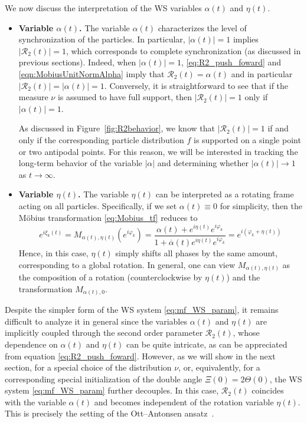 \documentclass[10pt]{article}
\theoremstyle{definition}
\theoremstyle{definition}
\numberwithin{equation}{section}
\newcommand{\CR}{\mathcal{R}}
\newcommand{\alphaBar}{\overline{\alpha}}
\begin{document}
We now discuss the interpretation of the WS variables $\alpha(t)$ and $\eta(t)$.
\begin{itemize}
    \item \textbf{Variable $\alpha(t)$.}
   The variable
    $\alpha(t)$ characterizes the level of synchronization of the particles.
    In particular, $|\alpha(t)| = 1$ implies $|\CR_2(t)| = 1$, which corresponds to complete synchronization (as discussed in previous sections). Indeed, when $|\alpha(t)| = 1$,  \eqref{eq:R2_push_foward} and \eqref{eqn:MobiusUnitNormAlpha} imply that $\CR_2(t) = \alpha(t)$ and in particular $|\CR_2(t)| = |\alpha(t)| = 1$. Conversely, it is straightforward to see that if the measure $\nu$ is assumed to have full support, then $|\CR_2(t)|=1$ only if $|\alpha(t)|=1$. 
    
    As discussed in Figure~\ref{fig:R2behavior}, we know that  $|\CR_2(t)|=1$ if and only if the corresponding particle distribution $f$ is supported on a single point or two antipodal points. For this reason, we will be interested in tracking the long-term behavior of the variable $|\alpha|$ and determining whether $|\alpha(t)| \rightarrow 1$ as $t \rightarrow \infty$.

    \item \textbf{Variable $\eta(t)$.}
    The variable $\eta(t)$ can be interpreted as a rotating frame acting on all particles. 
    Specifically, if we set $\alpha(t) \equiv 0$ for simplicity, then the Möbius transformation \eqref{eq:Mobius_tf} reduces to
    \begin{equation}
    e^{i\xi_k(t)} = M_{\alpha(t), \eta(t)} (e^{i \varphi_k}) = \frac{\alpha(t) + e^{i\eta(t)} e^{i \varphi_k}}{1 + \alphaBar(t) e^{i\eta(t)} e^{i \varphi_k}} = e^{i (\varphi_k + \eta(t))}
    \end{equation}
    Hence, in this case, $\eta(t)$ simply shifts all phases by the same amount, corresponding to a global rotation. In general, one can view $M_{\alpha(t), \eta(t)}$ as the composition of a rotation (counterclockwise by $\eta(t)$) and the transformation $M_{\alpha(t), 0}$.
\end{itemize}


Despite the simpler form of the WS system  \eqref{eq:mf_WS_param}, it remains difficult to analyze it in general since the variables $\alpha(t)$ and $\eta(t)$ are implicitly coupled through the second order parameter $\CR_2(t)$, whose dependence on $\alpha(t)$ and $\eta(t)$ can be quite intricate, as can be appreciated from equation \eqref{eq:R2_push_foward}.
However, as we will show in the next section, for a special choice of the distribution $\nu$, or, equivalently, for a corresponding special initialization of the double angle $\Xi(0) = 2\Theta(0)$, the WS system \eqref{eq:mf_WS_param} further decouples.
In this case, $\CR_2(t)$ coincides with the variable $\alpha(t)$ and becomes independent of the rotation variable $\eta(t)$.
This is precisely the setting of the Ott--Antonsen ansatz~\cite{ott2008low}.
\end{document}
